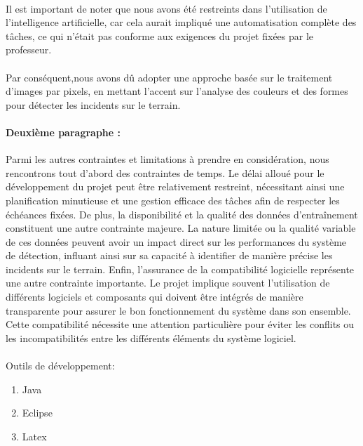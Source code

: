 \paragraph{} Il est important de noter que nous avons été restreints dans l'utilisation de l'intelligence artificielle, car cela aurait impliqué une automatisation complète des tâches, ce qui n'était pas conforme aux exigences du projet fixées par le professeur. 

\paragraph{} Par conséquent,nous avons dû adopter une approche basée sur le traitement d'images par pixels, en mettant l'accent sur l'analyse des couleurs et des formes pour détecter les incidents sur le terrain.

\paragraph{Deuxième paragraphe :}

Parmi les autres contraintes et limitations à prendre en considération, nous rencontrons tout d'abord des contraintes de temps. Le délai alloué pour le développement du projet peut être relativement restreint, nécessitant ainsi une planification minutieuse et une gestion efficace des tâches afin de respecter les échéances fixées. De plus, la disponibilité et la qualité des données d'entraînement constituent une autre contrainte majeure. La nature limitée ou la qualité variable de ces données peuvent avoir un impact direct sur les performances du système de détection, influant ainsi sur sa capacité à identifier de manière précise les incidents sur le terrain.
Enfin, l'assurance de la compatibilité logicielle représente une autre contrainte importante. Le projet implique souvent l'utilisation de différents logiciels et composants qui doivent être intégrés de manière transparente pour assurer le bon fonctionnement du système dans son ensemble. Cette compatibilité nécessite une attention particulière pour éviter les conflits ou les incompatibilités entre les différents éléments du système logiciel.

\paragraph{} Outils de développement:
\begin{enumerate}
\item Java
\item Eclipse
\item Latex
\end{enumerate}

